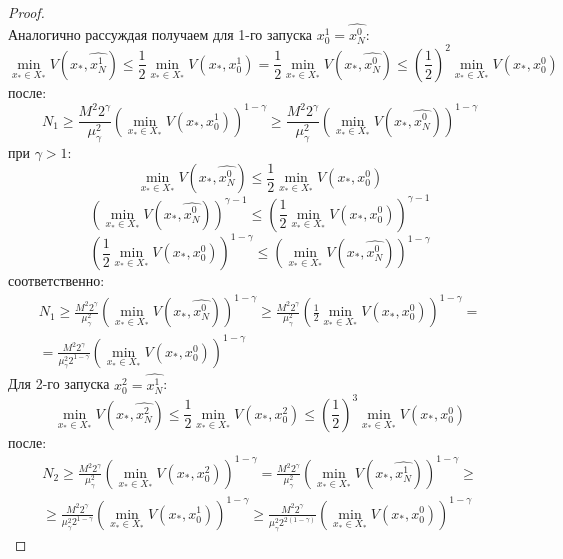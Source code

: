 \begin{proof}
$$       $$
       Аналогично рассуждая получаем для 1-го запуска $x_0^1 = \widehat{x_N^0}$:
       $$
           \min\limits_{x_* \in X_*}{V(x_*, \widehat{x_N^1})} \leq \frac{1}{2} \min\limits_{x_* \in X_*}{V(x_*, x_0^1)} = \frac{1}{2} \min\limits_{x_* \in X_*}{V(x_*, \widehat{x_N^0})} \leq \left(\frac{1}{2}\right)^2 \min\limits_{x_* \in X_*}{V(x_*, x_0^0)}
       $$
       после:
       $$
           N_1 \geq \frac{M^2 2^{\gamma}}{\mu_{\gamma}^2} \left(\min\limits_{x_* \in X_*}{V(x_*, x_0^1)}\right)^{1 - \gamma} \geq \frac{M^2 2^{\gamma}}{\mu_{\gamma}^2} \left(\min\limits_{x_* \in X_*}{V(x_*, \widehat{x_N^0})}\right)^{1 - \gamma} 
       $$
       при $\gamma > 1$:
       $$
           \min\limits_{x_* \in X_*}{V(x_*, \widehat{x_N^0})} \leq \frac{1}{2}\min\limits_{x_* \in X_*}{V(x_*, x_0^0)}  
       $$
       $$
           \left(\min\limits_{x_* \in X_*}{V(x_*, \widehat{x_N^0})}\right)^{\gamma - 1} \leq \left(\frac{1}{2} \min\limits_{x_* \in X_*}{V(x_*, x_0^0)}\right)^{\gamma - 1}
       $$
       $$
            \left(\frac{1}{2} \min\limits_{x_* \in X_*}{V(x_*, x_0^0)}\right)^{1 - \gamma} \leq \left(\min\limits_{x_* \in X_*}{V(x_*, \widehat{x_N^0})}\right)^{1 - \gamma}
       $$
       соответственно:
       $$
       \begin{aligned}
           N_1 \geq \frac{M^2 2^{\gamma}}{\mu_{\gamma}^2} \left(\min\limits_{x_* \in X_*}{V(x_*, \widehat{x_N^0})}\right)^{1 - \gamma} \geq \frac{M^2 2^{\gamma}}{\mu_{\gamma}^2} \left(\frac{1}{2} \min\limits_{x_* \in X_*}{V(x_*, x_0^0)}\right)^{1 - \gamma} =\\
           = \frac{M^2 2^{\gamma}}{\mu_{\gamma}^2 2^{1-\gamma}} \left(\min\limits_{x_* \in X_*}{V(x_*, x_0^0)}\right)^{1 - \gamma}
       \end{aligned}
       $$
       Для 2-го запуска $x_0^2 = \widehat{x_N^1}$:
       $$
           \min\limits_{x_* \in X_*}{V(x_*, \widehat{x_N^2})} \leq \frac{1}{2} \min\limits_{x_* \in X_*}{V(x_*, x_0^2)} \leq (\frac{1}{2})^3 \min\limits_{x_* \in X_*}{V(x_*, x_0^0)} 
       $$
       после:
       $$
       \begin{aligned}
           N_2 \geq \frac{M^2 2^{\gamma}}{\mu_{\gamma}^2} \left(\min\limits_{x_* \in X_*}{V(x_*, x_0^2)}\right)^{1 - \gamma} = \frac{M^2 2^{\gamma}}{\mu_{\gamma}^2} \left(\min\limits_{x_* \in X_*}{V(x_*, \widehat{x_N^1})}\right)^{1 - \gamma} \geq\\
           \geq \frac{M^2 2^{\gamma}}{\mu_{\gamma}^2 2^{1 - \gamma}} \left(\min\limits_{x_* \in X_*}{V(x_*, x_0^1)}\right)^{1 - \gamma} \geq \frac{M^2 2^{\gamma}}{\mu_{\gamma}^2 2^{2(1 - \gamma)}} \left(\min\limits_{x_* \in X_*}{V(x_*, x_0^0)}\right)^{1 - \gamma}

\end{aligned}$$
\end{proof}
